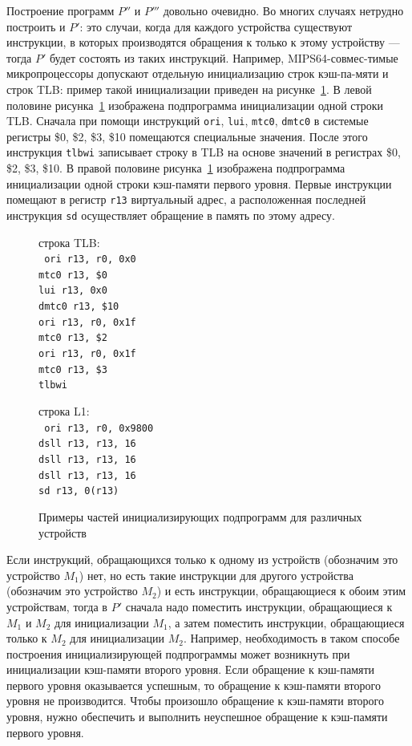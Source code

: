 Построение программ $P''$ и $P'''$ довольно очевидно. Во многих случаях нетрудно построить и $P'$: это случаи, когда для каждого устройства существуют инструкции, в которых производятся обращения к только к этому устройству --- тогда $P'$ будет состоять из таких инструкций. Например, MIPS64-совмес-тимые микропроцессоры допускают отдельную инициализацию строк кэш-па-мяти и строк TLB: пример такой инициализации приведен на рисунке~\ref{fig:blocks_init_examples}. В левой половине рисунка~\ref{fig:blocks_init_examples} изображена подпрограмма инициализации одной строки TLB. Сначала при помощи инструкций \texttt{ori}, \texttt{lui}, \texttt{mtc0}, \texttt{dmtc0} в системые регистры \$0, \$2, \$3, \$10 помещаются специальные значения. После этого инструкция \texttt{tlbwi} записывает строку в TLB на основе значений в регистрах \$0, \$2, \$3, \$10. В правой половине рисунка~\ref{fig:blocks_init_examples} изображена подпрограмма инициализации одной строки кэш-памяти первого уровня. Первые инструкции помещают в регистр \texttt{r13} виртуальный адрес, а расположенная последней инструкция \texttt{sd} осуществляет обращение в память по этому адресу.

\begin{figure}[h] \centering
\parbox{0.4\textwidth}{
строка TLB:\\
{\small \tt
    ori r13, r0, 0x0\\
    mtc0 r13, \$0\\
    lui r13, 0x0\\
    dmtc0 r13, \$10\\
    ori r13, r0, 0x1f\\
    mtc0 r13, \$2\\
    ori r13, r0, 0x1f\\
    mtc0 r13, \$3\\
    tlbwi\\}
} \qquad
\parbox{0.4\textwidth}{
строка L1:\\
{\small \tt
    ori r13, r0, 0x9800\\
    dsll r13, r13, 16\\
    dsll r13, r13, 16\\
    dsll r13, r13, 16\\
    sd r13, 0(r13)\\}
} \caption{Примеры частей инициализирующих подпрограмм для различных устройств}\label{fig:blocks_init_examples}
\end{figure}

Если инструкций, обращающихся только к одному из устройств (обозначим это устройство $M_1$) нет, но есть такие инструкции для другого устройства (обозначим это устройство $M_2$) и есть инструкции, обращающиеся к обоим этим устройствам, тогда в $P'$ сначала надо поместить инструкции, обращающиеся к $M_1$ и $M_2$ для инициализации $M_1$, а затем поместить инструкции, обращающиеся только к $M_2$ для инициализации $M_2$. Например, необходимость в таком способе построения инициализирующей подпрограммы может возникнуть при инициализации кэш-памяти второго уровня. Если обращение к кэш-памяти первого уровня оказывается успешным, то обращение к кэш-памяти второго уровня не производится. Чтобы произошло обращение к кэш-памяти второго уровня, нужно обеспечить и выполнить неуспешное обращение к кэш-памяти первого уровня.

